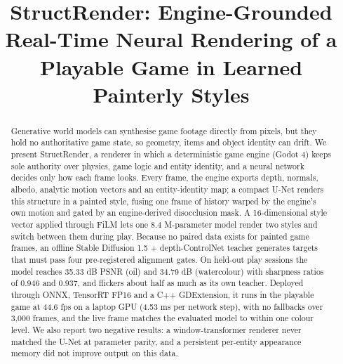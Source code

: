 \documentclass[conference]{IEEEtran}
\begin{document}
\title{StructRender: Engine-Grounded Real-Time Neural Rendering of a Playable Game in Learned Painterly Styles}
\author{
\and
{}
\and
{}
}
\maketitle
\begin{abstract}
Generative world models can synthesise game footage directly from pixels, but they hold no authoritative game state, so geometry, items and object identity can drift. We present StructRender, a renderer in which a deterministic game engine (Godot 4) keeps sole authority over physics, game logic and entity identity, and a neural network decides only how each frame looks. Every frame, the engine exports depth, normals, albedo, analytic motion vectors and an entity-identity map; a compact U-Net renders this structure in a painted style, fusing one frame of history warped by the engine's own motion and gated by an engine-derived disocclusion mask. A 16-dimensional style vector applied through FiLM lets one 8.4 M-parameter model render two styles and switch between them during play. Because no paired data exists for painted game frames, an offline Stable Diffusion 1.5 + depth-ControlNet teacher generates targets that must pass four pre-registered alignment gates. On held-out play sessions the model reaches 35.33 dB PSNR (oil) and 34.79 dB (watercolour) with sharpness ratios of 0.946 and 0.937, and flickers about half as much as its own teacher. Deployed through ONNX, TensorRT FP16 and a C++ GDExtension, it runs in the playable game at 44.6 fps on a laptop GPU (4.53 ms per network step), with no fallbacks over 3,000 frames, and the live frame matches the evaluated model to within one colour level. We also report two negative results: a window-transformer renderer never matched the U-Net at parameter parity, and a persistent per-entity appearance memory did not improve output on this data.
\end{abstract}
\end{document}
